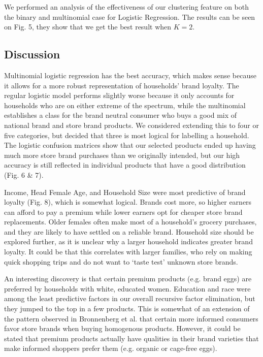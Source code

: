 \documentclass[conference]{IEEEtran}
\begin{document}
We performed an analysis of the effectiveness of our clustering feature on both the binary and multinomial case for Logistic Regression. The results can be seen on Fig. 5, they show that we get the best result when $K=2$.

\subsection{Discussion}
Multinomial logistic regression has the best accuracy, which makes sense because it allows for a more robust representation of households' brand loyalty. The regular logistic model performs slightly worse because it only accounts for households who are on either extreme of the spectrum, while the multinomial establishes a class for the brand neutral consumer who buys a good mix of national brand and store brand products. We considered extending this to four or five categories, but decided that three is most logical for labelling a household. The logistic confusion matrices show that our selected products ended up having much more store brand purchases than we originally intended, but our high accuracy is still reflected in individual products that have a good distribution (Fig. 6 \& 7).


Income, Head Female Age, and Household Size were most predictive of brand loyalty (Fig. 8), which is somewhat logical. Brands cost more, so higher earners can afford to pay a premium while lower earners opt for cheaper store brand replacements. Older females often make most of a household's grocery purchases, and they are likely to have settled on a reliable brand. Household size should be explored further, as it is unclear why a larger household indicates greater brand loyalty. It could be that this correlates with larger families, who rely on making quick shopping trips and do not want to `taste test' unknown store brands. 


An interesting discovery is that certain premium products (e.g. brand eggs) are preferred by households with white, educated women. Education and race were among the least predictive factors in our overall recursive factor elimination, but they jumped to the top in a few products. This is somewhat of an extension of the pattern observed in Bronnenberg et al.\cite{bronnenberg2014pharmacists} that certain more informed consumers favor store brands when buying homogenous products. However, it could be stated that premium products actually have qualities in their brand varieties that make informed shoppers prefer them (e.g. organic or cage-free eggs).
\end{document}
